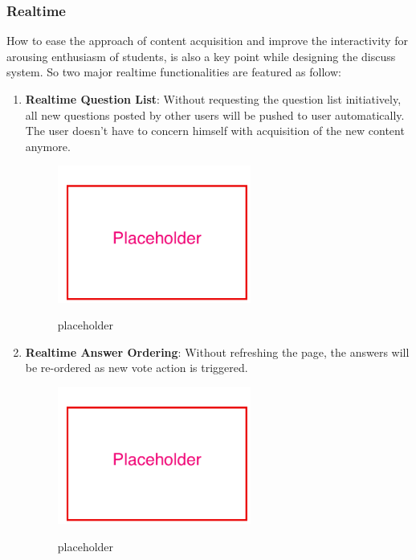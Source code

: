 \subsubsection{Realtime}
How to ease the approach of content acquisition and improve the interactivity for arousing enthusiasm of students, is also a key point while designing the discuss system. So two major realtime functionalities are featured as follow: 


\begin{enumerate}
\item
\textbf{Realtime Question List}: Without requesting the question list initiatively, all new questions posted by other users will be pushed to user automatically. The user doesn't have to concern himself with acquisition of the new content anymore.

\begin{figure}[!htbp]
  \caption{placeholder}
  \centering
    \includegraphics[width=0.6\textwidth]{Figures/placeholder.png}
  \label{fig:placeholder}
\end{figure}

\item
\textbf{Realtime Answer Ordering}: Without refreshing the page, the answers will be re-ordered as new vote action is triggered.

\begin{figure}[!htbp]
  \caption{placeholder}
  \centering
    \includegraphics[width=0.6\textwidth]{Figures/placeholder.png}
  \label{fig:placeholder}
\end{figure}


\end{enumerate}
